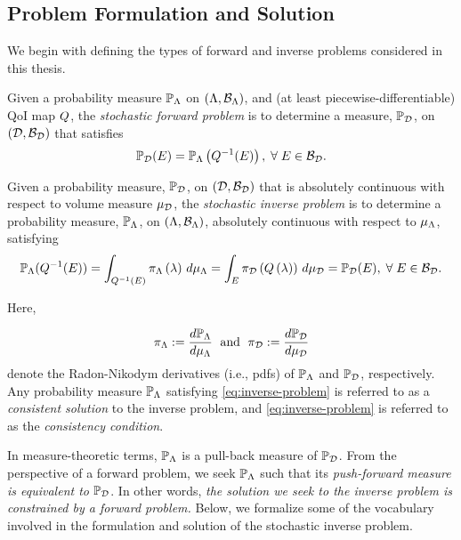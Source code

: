 \subsection{Problem Formulation and Solution}
We begin with defining the types of forward and inverse problems considered in this thesis.

\begin{defn}\label{defn:forward-problem}
  Given a probability measure $\mathbb{P}_{\Lambda}$ on $({\Lambda}, \mathcal{B}_{{\Lambda}})$, and (at least piecewise-differentiable) QoI map $Q$, the \emph{stochastic forward problem} is to determine a measure, $\mathbb{P}_{\mathcal{D}}$, on $(\mathcal{D}, \mathcal{B}_{\mathcal{D}})$ that satisfies
  \begin{equation}\label{eq:forward-problem}
    \mathbb{P}_{\mathcal{D}} (E) = \mathbb{P}_{\Lambda} \left ( Q^{-1}(E) \right ), \; \forall \; E \in \mathcal{B}_{\mathcal{D}}.
  \end{equation}
\end{defn}

\begin{defn}\label{defn:inverse-problem}
  Given a probability measure, $\mathbb{P}_{\mathcal{D}}$, on $(\mathcal{D}, \mathcal{B}_{\mathcal{D}})$ that is absolutely continuous with respect to volume measure $\mu_{\mathcal{D}}$, the \emph{stochastic inverse problem} is to determine a probability measure, $\mathbb{P}_{\Lambda}$, on $({\Lambda}, \mathcal{B}_{{\Lambda}})$, absolutely continuous with respect to $\mu_{{\Lambda}}$, satisfying
  \begin{equation}\label{eq:inverse-problem}
    \mathbb{P}_{\Lambda} (Q^{-1}(E)) = \int_{Q^{-1}(E)} \pi_{\Lambda} \left ( \lambda \right ) \, d\mu_{{\Lambda}} = \int_E \pi_{\mathcal{D}} \left ( Q\left ( \lambda \right ) \right ) \, d\mu_{\mathcal{D}} = \mathbb{P}_{\mathcal{D}}(E), \; \forall \; E \in \mathcal{B}_{\mathcal{D}}.
  \end{equation}

  \noindent Here,

  \begin{equation*}
    \pi_{\Lambda} := \frac{d\mathbb{P}_{\Lambda}}{d\mu_{{\Lambda}}} \;\text{ and }\; \pi_{\mathcal{D}} := \frac{d\mathbb{P}_{\mathcal{D}}}{d\mu_{\mathcal{D}}}
  \end{equation*}
  denote the Radon-Nikodym derivatives (i.e., pdfs) of $\mathbb{P}_{\Lambda}$ and $\mathbb{P}_{\mathcal{D}}$, respectively.
  Any probability measure $\mathbb{P}_{\Lambda}$ satisfying \eqref{eq:inverse-problem} is referred to as a \emph{consistent solution} to the inverse problem, and \eqref{eq:inverse-problem} is referred to as the \emph{consistency condition}.
\end{defn}

In measure-theoretic terms, $\mathbb{P}_{\Lambda}$ is a pull-back measure of $\mathbb{P}_{\mathcal{D}}$.
From the perspective of a forward problem, we seek $\mathbb{P}_{\Lambda}$ such that its \emph{push-forward measure is equivalent to} $\mathbb{P}_{\mathcal{D}}$.
In other words, \emph{the solution we seek to the inverse problem is constrained by a forward problem.}
Below, we formalize some of the vocabulary involved in the formulation and solution of the stochastic inverse problem.

